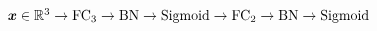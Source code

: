 $\vect{x} \in \real^3
	\newline \rightarrow \text{FC}_{3} \rightarrow \text{BN} \rightarrow \text{Sigmoid}
	\newline \rightarrow \text{FC}_{2} \rightarrow \text{BN} \rightarrow \text{Sigmoid}$